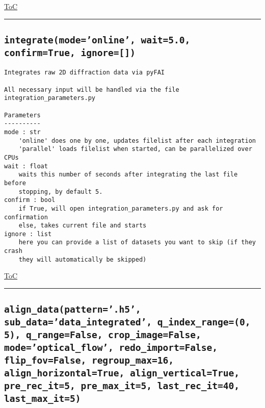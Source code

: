 \documentclass{article}
\begin{document}
\begin{flushright}

\hyperref[toc]{ToC}

\end{flushright}



\vspace{5mm}

\hrule

\subsection*{\texttt{integrate(mode='online', wait=5.0, confirm=True, ignore=[])}}
\label{fun:integrate}

\begin{lstlisting}[language=docstring]
Integrates raw 2D diffraction data via pyFAI

All necessary input will be handled via the file integration_parameters.py

Parameters
----------
mode : str
    'online' does one by one, updates filelist after each integration
    'parallel' loads filelist when started, can be parallelized over CPUs
wait : float
    waits this number of seconds after integrating the last file before
    stopping, by default 5.
confirm : bool
    if True, will open integration_parameters.py and ask for confirmation
    else, takes current file and starts
ignore : list
    here you can provide a list of datasets you want to skip (if they crash
    they will automatically be skipped)
\end{lstlisting}

\begin{flushright}

\hyperref[toc]{ToC}

\end{flushright}



\vspace{5mm}

\hrule

\subsection*{\texttt{align\_data(pattern='.h5', sub\_data='data\_integrated', q\_index\_range=(0, 5), q\_range=False, crop\_image=False, mode='optical\_flow', redo\_import=False, flip\_fov=False, regroup\_max=16, align\_horizontal=True, align\_vertical=True, pre\_rec\_it=5, pre\_max\_it=5, last\_rec\_it=40, last\_max\_it=5)}}
\label{fun:aligndata}
\end{document}
